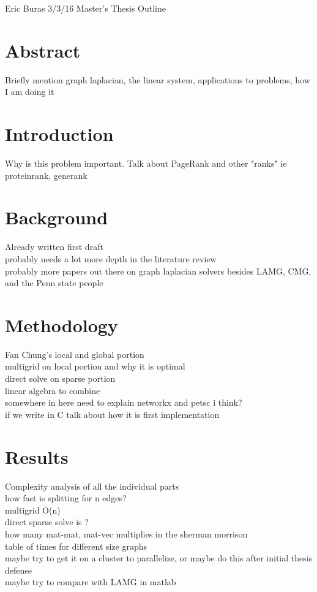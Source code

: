 \documentclass{article}
\begin{document}
Eric Buras 3/3/16 Master's Thesis Outline
\\
\section{Abstract}
Briefly mention graph laplacian, the linear system, applications to problems, how I am doing it

\section{Introduction}
Why is this problem important. Talk about PageRank and other "ranks" ie proteinrank, generank

\section{Background}
Already written first draft\\
probably needs a lot more depth in the literature review\\
probably more papers out there on graph laplacian solvers besides LAMG, CMG, and the Penn state people

\section{Methodology}
Fan Chung's local and global portion\\
multigrid on local portion and why it is optimal\\
direct solve on sparse portion\\
linear algebra to combine\\
somewhere in here need to explain networkx and petsc i think?\\
if we write in C talk about how it is first implementation


\section{Results}
Complexity analysis of all the individual parts\\
how fast is splitting for n edges?\\
multigrid O(n)\\
direct sparse solve is ?\\
how many mat-mat, mat-vec multiplies in the sherman morrison\\
table of times for different size graphs\\
maybe try to get it on a cluster to parallelize, or maybe do this after initial thesis defense\\
maybe try to compare with LAMG in matlab\\
\end{document}
